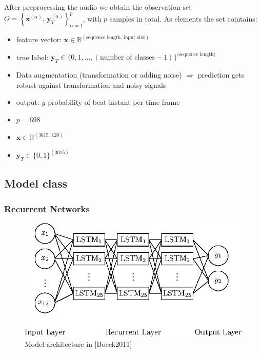 \documentclass{article}
\begin{document}
After preprocessing the audio we obtain the observation set $ O = \left\{ \mathbf x^{(\alpha)}, \,\mathbf y_T^{(\alpha)} \right \}_{\alpha = 1}^p$, with $p$ samples in total. As elements the set cointains:
\begin{itemize}
\item feature vector: $\mathbf x \in \mathbb R^{(\text{sequence length}, \,\text{input size})}$
\item true label: $\mathbf y_T \in \{0,1, \dots, (\text{number of classes}-1)\}^{\text{(sequence length)}}$
\end{itemize}

\begin{itemize}
\item Data augmentation (transformation or adding noise) $\Rightarrow$ prediction gets robust against transformation and noisy signals
\item output: $y$ probability of beat instant per time frame 
\end{itemize}


\begin{itemize}
\item $p = 698$
\item $\mathbf x \in \mathbb R^{(3015, \,120)}$
\item $\mathbf y_T \in \{0,1\}^{(3015)}$
\end{itemize}

\subsection{Model class}

\subsubsection{Recurrent Networks}


\begin{figure}[htbp]
\centering
\includegraphics[scale=1.0]{figures/neural_network_boeck.eps}
\caption{Model architecture in \cite{Boeck2011}[Boeck2011]}
\label{fig:}
\end{figure}	
\end{document}
